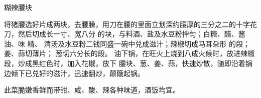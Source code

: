 \begin{recipe}[宫保腰块]{糊辣腰块}

\ingredients


\preparation

\step 将猪腰选好片成两块，去腰臊，用刀在腰的里面立划深约腰厚的三分之二的十字花
刀，然后切成长一寸、宽八分 的块，与料酒、盐及水豆粉拌匀；白糖、醋、酱油、味
精、 清汤及水豆粉二钱同盛一碗中兑成滋汁；辣椒切成马耳朵形 的段；姜、蒜切薄片；
葱切六分长的段。
\step 油下锅，在旺火上烧到八成火候时，放进辣椒段，炒成黑红色时，加入花椒，放下
腰块、葱、姜、蒜，快速炒散，随即沿着锅边倾下已兑好的滋汁，迅速翻炒，颠簸起锅。

\features

此菜脆嫩香鲜而带甜、咸、酸、辣各种味道，酒饭均宜。

\end{recipe}

